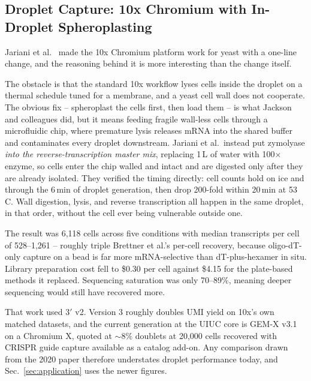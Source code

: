\subsection{Droplet Capture: 10x Chromium with In-Droplet Spheroplasting}
\label{sec:jariani}

Jariani et al.\ \citep{jarianiNewProtocolSinglecell2020} made the 10x Chromium platform work for
yeast with a one-line change, and the reasoning behind it is more interesting than
the change itself.

The obstacle is that the standard 10x workflow lyses cells inside the droplet on a
thermal schedule tuned for a membrane, and a yeast cell wall does not cooperate.
The obvious fix -- spheroplast the cells first, then load them -- is what
Jackson and colleagues did, but it means feeding fragile wall-less cells through a
microfluidic chip, where premature lysis releases mRNA into the shared buffer and
contaminates every droplet downstream. Jariani et al.\ instead put zymolyase \emph{into the
reverse-transcription master mix}, replacing 1\,\textmu L of water with
100$\times$ enzyme, so cells enter the chip walled and intact and are digested only
after they are already isolated. They verified the timing directly: cell counts
hold on ice and through the 6\,min of droplet generation, then drop 200-fold within
20\,min at 53\,\textdegree C. Wall digestion, lysis, and reverse transcription all
happen in the same droplet, in that order, without the cell ever being vulnerable
outside one.

The result was 6{,}118 cells across five conditions with median transcripts per
cell of 528--1{,}261 -- roughly triple Brettner et al.'s per-cell recovery, because
oligo-dT-only capture on a bead is far more mRNA-selective than dT-plus-hexamer in
situ. Library preparation cost fell to \$0.30 per cell against \$4.15 for the
plate-based methods it replaced. Sequencing saturation was only 70--89\%, meaning
deeper sequencing would still have recovered more.

 That work used 3$'$ v2. Version 3 roughly
doubles UMI yield on 10x's own matched datasets, and the current generation at the
UIUC core is GEM-X v3.1 on a Chromium X, quoted at $\sim$8\% doublets at 20{,}000
cells recovered with CRISPR guide capture available as a catalog add-on. Any
comparison drawn from the 2020 paper therefore understates droplet performance
today, and Sec.~\ref{sec:application} uses the newer figures.

